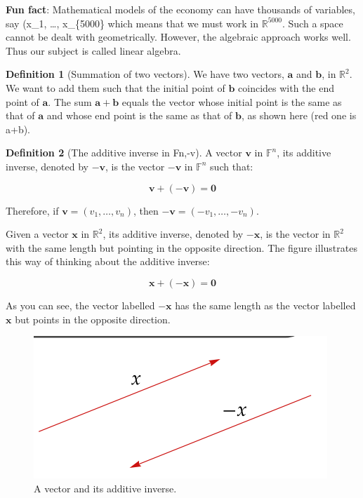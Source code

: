 \documentclass[
]{book}
\theoremstyle{definition}
\newtheorem{definition}{Definition}[chapter]
\theoremstyle{definition}
\theoremstyle{definition}
\theoremstyle{definition}
\theoremstyle{remark}
\begin{document}
\textbf{Fun fact}: Mathematical models of the economy
can have thousands of variables, say
(x\_1, \ldots, x\_\{5000\} which means that we must
work in \({\mathbb{R}}^{5000}\). Such a space cannot be
dealt with geometrically. However, the
algebraic approach works well. Thus
our subject is called linear algebra.

\begin{definition}[Summation of two vectors]
\protect\hypertarget{def:unnamed-chunk-17}{}\label{def:unnamed-chunk-17}We have two vectors, \(\mathbf{a}\) and \(\mathbf{b}\), in \(\mathbb{R}^2\). We want to add them such that the initial point of \(\mathbf{b}\) coincides with the end point of \(\mathbf{a}\). The sum \(\mathbf{a} + \mathbf{b}\) equals the vector whose initial point is the same as that of \(\mathbf{a}\) and whose end point is the same as that of \(\mathbf{b}\), as shown here (red one is a+b).
\end{definition}

\begin{definition}[The additive inverse in Fn,-v]
\protect\hypertarget{def:unnamed-chunk-18}{}\label{def:unnamed-chunk-18}A vector \(\mathbf{v}\) in \(\mathbb{F}^n\), its additive inverse, denoted by \(-\mathbf{v}\), is the vector \(-\mathbf{v}\) in \(\mathbb{F}^n\) such that:

\[ \mathbf{v} + (-\mathbf{v}) = \mathbf{0} \]

Therefore, if \(\mathbf{v} = (v_1, \ldots, v_n)\), then \(-\mathbf{v} = (-v_1, \ldots, -v_n)\).
\end{definition}

Given a vector \(\mathbf{x}\) in \(\mathbb{R}^2\), its additive inverse, denoted by \(-\mathbf{x}\), is the vector in \(\mathbb{R}^2\) with the same length but pointing in the opposite direction. The figure illustrates this way of thinking about the additive inverse:

\[ \mathbf{x} + (-\mathbf{x}) = \mathbf{0} \]

As you can see, the vector labelled \(-\mathbf{x}\) has the same length as the vector labelled \(\mathbf{x}\) but points in the opposite direction.

\begin{figure}
\centering
\includegraphics{fig/Chapter-1/fig7.png}
\caption{A vector and its additive inverse.}
\end{figure}
\end{document}
